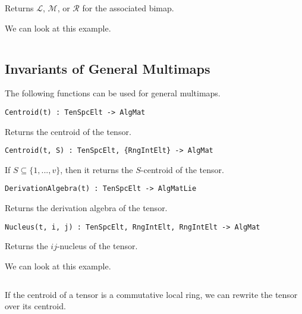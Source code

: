 \documentclass{amsart}
\begin{document}
Returns $\mathcal{L}$, $\mathcal{M}$, or $\mathcal{R}$ for the associated bimap.

We can look at this example.
{\small
\begin{lstlisting}[frame=single,basicstyle=\ttfamily\color{black!30!teal},backgroundcolor=\color{white!70!gray}]
\end{lstlisting}
}

\subsection{Invariants of General Multimaps}

The following functions can be used for general multimaps.

\color{blue}
{\small \begin{verbatim}
Centroid(t) : TenSpcElt -> AlgMat
\end{verbatim} }
\color{black}

Returns the centroid of the tensor.

\color{blue}
{\small \begin{verbatim}
Centroid(t, S) : TenSpcElt, {RngIntElt} -> AlgMat
\end{verbatim} }
\color{black}

If $S\subseteq\{ 1,...,v\}$, then it returns the $S$-centroid of the tensor.

\color{blue}
{\small \begin{verbatim}
DerivationAlgebra(t) : TenSpcElt -> AlgMatLie
\end{verbatim} }
\color{black}

Returns the derivation algebra of the tensor.

\color{blue}
{\small \begin{verbatim}
Nucleus(t, i, j) : TenSpcElt, RngIntElt, RngIntElt -> AlgMat
\end{verbatim} }
\color{black}

Returns the $ij$-nucleus of the tensor. 

We can look at this example.
{\small
\begin{lstlisting}[frame=single,basicstyle=\ttfamily\color{black!30!teal},backgroundcolor=\color{white!70!gray}]
\end{lstlisting}
}

If the centroid of a tensor is a commutative local ring, we can rewrite the 
tensor over its centroid.
\end{document}
